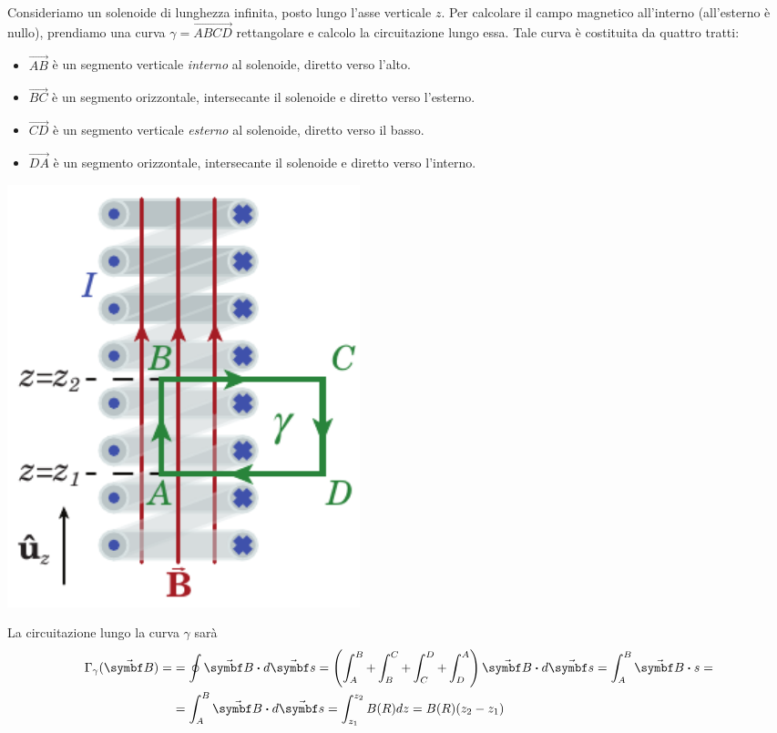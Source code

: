 \begin{examplewt}
	Consideriamo un solenoide di lunghezza infinita, posto lungo l'asse verticale $z$. Per calcolare il campo magnetico all'interno (all'esterno è nullo), prendiamo una curva $\gamma=\overrightarrow{ABCD}$ rettangolare e calcolo la circuitazione lungo essa. Tale curva è costituita da quattro tratti:
	\begin{itemize}
		\item $\overrightarrow{AB}$ è un segmento verticale \textit{interno} al solenoide, diretto verso l'alto.
		\item $\overrightarrow{BC}$ è un segmento orizzontale, intersecante il solenoide e diretto verso l'esterno.
		\item $\overrightarrow{CD}$ è un segmento verticale \textit{esterno} al solenoide, diretto verso il basso.
		\item $\overrightarrow{DA}$ è un segmento orizzontale, intersecante il solenoide e diretto verso l'interno.
	\end{itemize}
	\begin{center}
		\includegraphics[width=0.45\textwidth]{images/chp9/chp9solenoidecircuitazione.pdf}
	\end{center}
	La circuitazione lungo la curva $\gamma$ sarà
	\begin{align*}
		\Gamma_{\gamma}(\vba{B})=&=\oint\vba{B}\vdot d\vba{s}=\left( \int_A^B + \int_B^C + \int_C^D + \int_D^A  \right) \vba{B}\vdot d\vba s= \int^B_A \vba{B}\vdot s=\\
		&=\int_{A}^{B}\vba{B}\vdot d\vba{s}=\int^{z_2}_{z_1} B(R)dz=B(R)(z_2-z_1)

\end{align*}
\end{examplewt}
